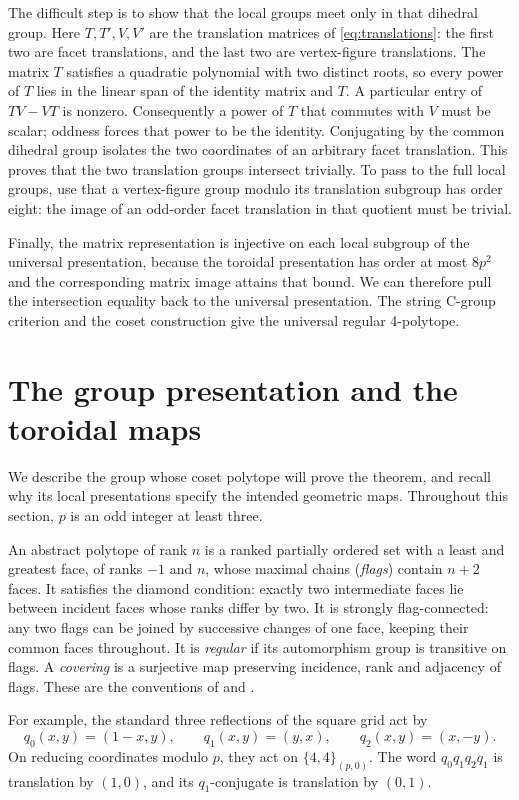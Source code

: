 \documentclass[11pt]{article}
\theoremstyle{definition}
\newcommand{\tor}[1]{\{4,4\}_{(#1,0)}}
\begin{document}
The difficult step is to show that the local groups meet only in that
dihedral group. Here $T,T',V,V'$ are the translation matrices of
\eqref{eq:translations}: the first two are facet translations, and the last
two are vertex-figure translations. The matrix $T$ satisfies a quadratic
polynomial with two distinct roots, so every power of $T$ lies in the
linear span of the identity matrix and $T$.
A particular entry of $TV-VT$ is nonzero. Consequently a power of $T$
that commutes with $V$ must be scalar; oddness forces that power to be
the identity. Conjugating by the common dihedral group isolates the two
coordinates of an arbitrary facet translation. This proves that the
two translation groups intersect trivially. To pass to the full local
groups, use that a vertex-figure group modulo its translation subgroup has
order eight: the image of an odd-order facet translation in that quotient
must be trivial.

Finally, the matrix representation is injective on each local subgroup
of the universal presentation, because the toroidal presentation has
order at most $8p^2$ and the corresponding matrix image attains that
bound. We can therefore pull the intersection equality back to the
universal presentation. The string C-group criterion and the coset
construction give the universal regular 4-polytope.

\section{The group presentation and the toroidal maps}\label{sec:groups}
We describe the group whose coset polytope will prove the theorem, and
recall why its local presentations specify the intended geometric maps.
Throughout this section, $p$ is an odd integer at least three.

An abstract polytope of rank $n$ is a ranked partially ordered set with
a least and greatest face, of ranks $-1$ and $n$, whose maximal chains
(\emph{flags}) contain $n+2$ faces. It satisfies the diamond condition:
exactly two intermediate faces lie between incident faces whose ranks
differ by two. It is strongly flag-connected: any two flags can be
joined by successive changes of one face, keeping their common faces
throughout. It is \emph{regular} if its automorphism group is transitive
on flags. A \emph{covering} is a surjective map preserving incidence,
rank and adjacency of flags. These are the conventions of
\cite[Section 2]{SW} and \cite[Chapter 2]{ARP}.

For example, the standard three reflections of the square grid act by
\begin{equation}\label{eq:affine}
 q_0(x,y)=(1-x,y),\qquad q_1(x,y)=(y,x),\qquad q_2(x,y)=(x,-y).
\end{equation}
On reducing coordinates modulo $p$, they act on $\tor{p}$. The word
$q_0q_1q_2q_1$ is translation by $(1,0)$, and its $q_1$-conjugate is
translation by $(0,1)$.
\end{document}
